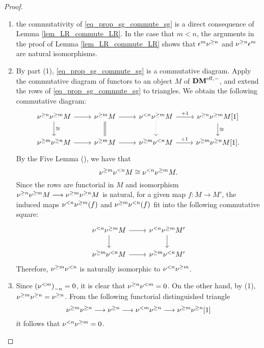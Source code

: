 \begin{proof}
\begin{enumerate}
\item the commutativity of \eqref{eq_prop_sg_commute_sg} is a
direct consequence of Lemma \ref{lem_LR_commute_LR}. In the
case that $m < n$, the arguments in the proof of Lemma 
\ref{lem_LR_commute_LR} shows that $\epsilon^m \sgDM{n}$ and
$\sgDM{n} \epsilon^m$ are natural isomorphisms.

\item By part (1), \eqref{eq_prop_sg_commute_sg} is a commutative
diagram. Apply the commutative diagram of functors to an object
$M$ of $\DMeff$, and extend the rows of 
\eqref{eq_prop_sg_commute_sg} to triangles. We obtain the 
following commutative diagram:
\[
\begin{tikzcd}
\sgDM{n} \sgDM{m} M \arrow{r} \arrow{d}{\cong} &
\sgDM{m} M \arrow{r} \arrow[equals]{d} &
\slDM{n} \sgDM{m} M \arrow{r}{+1} \arrow[dotted]{d} &
\sgDM{n} \sgDM{m} M[1] \arrow{d}{\cong}\\
\sgDM{m} \sgDM{n} M \arrow{r} &
\sgDM{m} M \arrow{r} &
\sgDM{m} \slDM{n} M \arrow{r}{+1} &
\sgDM{m} \sgDM{n} M[1].
\end{tikzcd}
\]
By the Five Lemma (\cite[10.2.2]{WH}), we have that
\[
\sgDM{m}\slDM{n} M \cong \slDM{n}\sgDM{m} M.
\]
Since the rows are functorial in $M$ and isomorphism
$\sgDM{n} \sgDM{m} M \to \sgDM{m}\sgDM{n} M$ is natural,
for a given map $f: M \to M'$, the induced maps 
$\slDM{n}\sgDM{m}(f)$ and $\sgDM{m}\slDM{n}(f)$ fit into the 
following commutative square:
\[
\begin{tikzcd}
\slDM{n} \sgDM{m} M \arrow{r} \arrow{d}
&\slDM{n} \sgDM{m} M' \arrow{d} \\
\sgDM{m}\slDM{n} M \arrow{r} &
\sgDM{m}\slDM{n} M'
\end{tikzcd}
\]
Therefore, $\sgDM{m} \slDM{n}$ is naturally isomorphic to 
$\slDM{n} \sgDM{m}$.

\item Since $\hZ[n]{(\slDM{m})} = 0$, it is clear that
$\sgDM{n}\slDM{m} = 0$. On the other hand, by (1), $\sgDM{m}\sgDM{n}
= \sgDM{n}$. From the following functorial distinguished triangle
\[
\sgDM{m} \sgDM{n} \to \sgDM{n} \to \slDM{m} \sgDM{n} \to \sgDM{m} 
   \sgDM{n}[1]
\]
it follows that $\slDM{n} \sgDM{m} = 0$.


\end{enumerate}
\end{proof}
